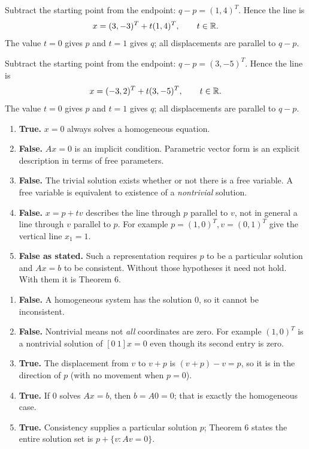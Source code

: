 Subtract the starting point from the endpoint:
$q-p=(1,4)^T$. Hence the line is
\[x=(3,-3)^T+t(1,4)^T,\qquad t\in\mathbb{R}.\]
The value $t=0$ gives $p$ and $t=1$ gives $q$; all displacements
are parallel to $q-p$.

Subtract the starting point from the endpoint:
$q-p=(3,-5)^T$. Hence the line is
\[x=(-3,2)^T+t(3,-5)^T,\qquad t\in\mathbb{R}.\]
The value $t=0$ gives $p$ and $t=1$ gives $q$; all displacements
are parallel to $q-p$.

\begin{enumerate}[label=(\alph*)]
\item \textbf{True.} $x=0$ always solves a homogeneous equation.
\item \textbf{False.} $Ax=0$ is an implicit condition. Parametric
vector form is an explicit description in terms of free parameters.
\item \textbf{False.} The trivial solution exists whether or not
there is a free variable. A free variable is equivalent to existence
of a \emph{nontrivial} solution.
\item \textbf{False.} $x=p+tv$ describes the line through $p$
parallel to $v$, not in general a line through $v$ parallel to $p$.
For example $p=(1,0)^T,v=(0,1)^T$ give the vertical line $x_1=1$.
\item \textbf{False as stated.} Such a representation requires $p$
to be a particular solution and $Ax=b$ to be consistent. Without
those hypotheses it need not hold. With them it is Theorem 6.
\end{enumerate}

\begin{enumerate}[label=(\alph*)]
\item \textbf{False.} A homogeneous system has the solution $0$, so
it cannot be inconsistent.
\item \textbf{False.} Nontrivial means not \emph{all} coordinates
are zero. For example $(1,0)^T$ is a nontrivial solution of
$[0\ 1]x=0$ even though its second entry is zero.
\item \textbf{True.} The displacement from $v$ to $v+p$ is
$(v+p)-v=p$, so it is in the direction of $p$ (with no movement
when $p=0$).
\item \textbf{True.} If $0$ solves $Ax=b$, then $b=A0=0$;
that is exactly the homogeneous case.
\item \textbf{True.} Consistency supplies a particular solution $p$;
Theorem 6 states the entire solution set is $p+\{v:Av=0\}$.
\end{enumerate}

